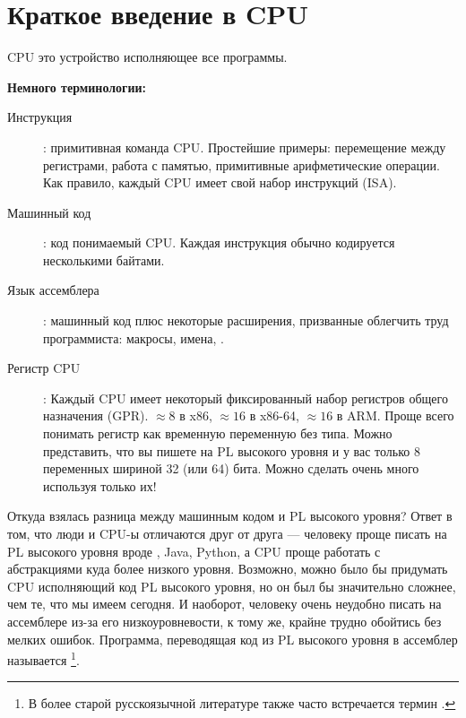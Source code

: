 \section{Краткое введение в CPU}

\ac{CPU} это устройство исполняющее все программы.

\textbf{Немного терминологии:}

\begin{description}
\item[Инструкция]: примитивная команда \ac{CPU}.
Простейшие примеры: перемещение между регистрами, работа с памятью, примитивные арифметические операции.
Как правило, каждый \ac{CPU} имеет свой набор инструкций (\ac{ISA}).

\item[Машинный код]: код понимаемый \ac{CPU}. 
Каждая инструкция обычно кодируется несколькими байтами.
\item[Язык ассемблера]: машинный код плюс некоторые расширения, призванные облегчить труд программиста: макросы, имена, \etc.
\item[Регистр CPU]: Каждый \ac{CPU} имеет некоторый фиксированный набор регистров общего назначения (\ac{GPR}).
$\approx 8$ в x86, $\approx 16$ в x86-64, $\approx 16$ в ARM.
Проще всего понимать регистр как временную переменную без типа.
Можно представить, что вы пишете на \ac{PL} высокого уровня и у вас только 8 переменных шириной 32 (или 64) бита.
Можно сделать очень много используя только их!
\end{description}


Откуда взялась разница между машинным кодом и \ac{PL} высокого уровня?  Ответ в том, что люди и \ac{CPU}-ы отличаются друг от друга ---
человеку проще писать на \ac{PL} высокого уровня вроде \CCpp, Java, Python, а \ac{CPU} проще работать с абстракциями куда более низкого уровня.
Возможно, можно было бы придумать \ac{CPU} исполняющий код \ac{PL} высокого уровня, но он был бы значительно сложнее, чем те, что мы имеем сегодня.
И наоборот, человеку очень неудобно писать на ассемблере из-за его низкоуровневости, к тому же, крайне трудно обойтись без мелких ошибок.
Программа, переводящая код из \ac{PL} высокого уровня в ассемблер называется 
\footnote{В более старой русскоязычной литературе также часто встречается термин .}.

%
%
%

